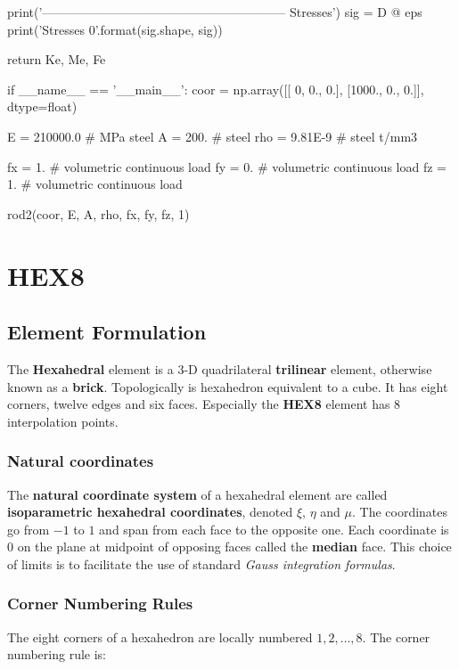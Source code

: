 \begin{python}
    print('----------------------------------------------------------- Stresses')
    sig = D @ eps
    print('Stresses {0}\n'.format(sig.shape, sig))

    return Ke, Me, Fe



if __name__ == '__main__':
    coor = np.array([[    0, 0., 0.],
                     [1000., 0., 0.]], dtype=float)

    E = 210000.0   # MPa steel
    A = 200.       # steel
    rho = 9.81E-9  # steel t/mm3

    fx = 1.  # volumetric continuous load
    fy = 0.  # volumetric continuous load
    fz = 1.  # volumetric continuous load

    rod2(coor, E, A, rho, fx, fy, fz, 1)

\end{python}



\newpage
\section{HEX8}

\subsection{Element Formulation}

The \textbf{Hexahedral} element is a 3-D quadrilateral \textbf{trilinear}
element, otherwise known as a \textbf{brick}. Topologically is hexahedron
equivalent to a cube. It has eight corners, twelve edges and six faces.
Especially the \textbf{HEX8} element has 8 interpolation points.

\subsubsection{Natural coordinates}
The \textbf{natural coordinate system} of a hexahedral element are called
\textbf{isoparametric hexahedral coordinates}, denoted $ \xi $, $ \eta $ and $ \mu $.
The coordinates go from $ -1 $ to $ 1 $ and span from each face to the opposite one.
Each coordinate is 0 on the plane at midpoint of opposing faces called the
\textbf{median} face. This choice of limits is to facilitate the use of standard
\textit{Gauss integration formulas}.

\subsubsection{Corner Numbering Rules}
The eight corners of a hexahedron are locally numbered $ 1, 2, \dots , 8 $.
The corner numbering rule is:

